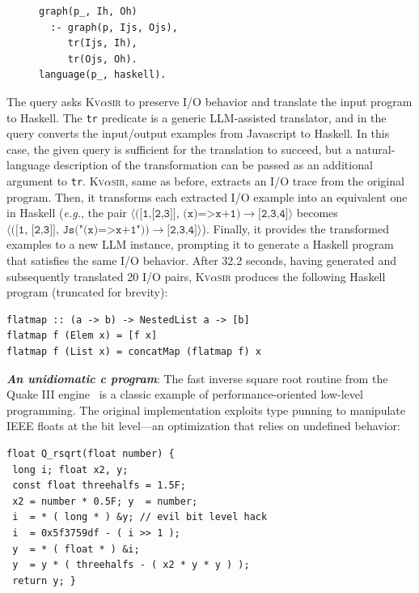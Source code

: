 \documentclass[nonacm,sigplan,review]{acmart}
\def\eg{{\em e.g.}, }
\newcommand{\sys}{{\scshape Kv{$\alpha$}sir}\xspace}
\newcommand{\heading}[1]{\vspace{2pt}\noindent\textbf{\emph{#1}}:\enspace}
\newcommand{\ttt}[1]{\texttt{#1}\xspace}
\begin{document}
\begin{figure}
\begin{verbatim}
graph(p_, Ih, Oh) 
  :- graph(p, Ijs, Ojs),
     tr(Ijs, Ih),
     tr(Ojs, Oh).
language(p_, haskell).
\end{verbatim}
\end{figure}
The query asks \sys to preserve I/O behavior and translate the input program to Haskell.
The \ttt{tr} predicate is a generic LLM-assisted translator, and in the query
converts the input/output examples from Javascript to Haskell.
In this case, the given query is sufficient for the translation to succeed, 
but a natural-language description of the transformation can be passed as an additional 
argument to \ttt{tr}.
\sys, same as before, extracts an I/O trace from the original program.
Then, it transforms each extracted I/O example into an equivalent one in Haskell (\eg 
the pair $\langle\ttt{([1,[2,3]], (x)=>x+1)}\to\ttt{[2,3,4]}\rangle$ 
becomes $\langle(\ttt{[1, [2,3]], Js("(x)=>x+1"))}\to\ttt{[2,3,4]}\rangle$).
Finally, it provides the transformed examples to a new LLM instance, prompting it
to generate a Haskell program that satisfies the same I/O behavior.
After 32.2 seconds, having generated and subsequently translated 20 I/O pairs,
\sys produces the following Haskell program (truncated for brevity):
\begin{verbatim}
flatmap :: (a -> b) -> NestedList a -> [b]
flatmap f (Elem x) = [f x]
flatmap f (List x) = concatMap (flatmap f) x
\end{verbatim}

\heading{An unidiomatic c program}
The fast inverse square root routine from the Quake III
engine~\cite{fast_inv_sqrt}
is a classic example of performance-oriented low-level programming.
The original implementation exploits type punning to manipulate IEEE
floats at the bit level---an optimization that relies on undefined behavior:

\begin{verbatim}
float Q_rsqrt(float number) {
 long i; float x2, y;
 const float threehalfs = 1.5F;
 x2 = number * 0.5F; y  = number;
 i  = * ( long * ) &y; // evil bit level hack
 i  = 0x5f3759df - ( i >> 1 );
 y  = * ( float * ) &i;
 y  = y * ( threehalfs - ( x2 * y * y ) );
 return y; }
\end{verbatim}
\end{document}
